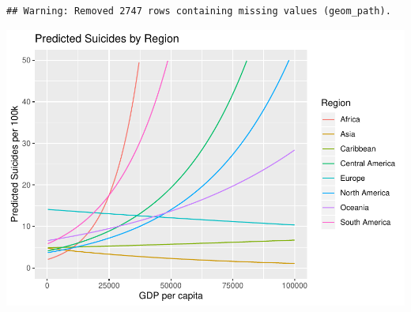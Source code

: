 \documentclass[11pt,]{article}
\begin{document}
\begin{verbatim}
## Warning: Removed 2747 rows containing missing values (geom_path).
\end{verbatim}

\includegraphics{An-Analysis-of-Suicide-Data_files/figure-latex/unnamed-chunk-13-1.pdf}
\end{document}
